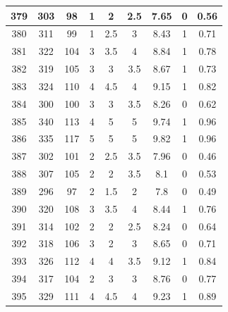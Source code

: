 \documentclass[11pt]{article}
\begin{document}
\begin{appendix}
\begin{longtable}[H]{|c|c|c|c|c|c|c|c|c|}
	379        & 303       & 98          & 1                 & 2   & 2.5 & 7.65 & 0        & 0.56            \\ \hline
	380        & 311       & 99          & 1                 & 2.5 & 3   & 8.43 & 1        & 0.71            \\ \hline
	381        & 322       & 104         & 3                 & 3.5 & 4   & 8.84 & 1        & 0.78            \\ \hline
	382        & 319       & 105         & 3                 & 3   & 3.5 & 8.67 & 1        & 0.73            \\ \hline
	383        & 324       & 110         & 4                 & 4.5 & 4   & 9.15 & 1        & 0.82            \\ \hline
	384        & 300       & 100         & 3                 & 3   & 3.5 & 8.26 & 0        & 0.62            \\ \hline
	385        & 340       & 113         & 4                 & 5   & 5   & 9.74 & 1        & 0.96            \\ \hline
	386        & 335       & 117         & 5                 & 5   & 5   & 9.82 & 1        & 0.96            \\ \hline
	387        & 302       & 101         & 2                 & 2.5 & 3.5 & 7.96 & 0        & 0.46            \\ \hline
	388        & 307       & 105         & 2                 & 2   & 3.5 & 8.1  & 0        & 0.53            \\ \hline
	389        & 296       & 97          & 2                 & 1.5 & 2   & 7.8  & 0        & 0.49            \\ \hline
	390        & 320       & 108         & 3                 & 3.5 & 4   & 8.44 & 1        & 0.76            \\ \hline
	391        & 314       & 102         & 2                 & 2   & 2.5 & 8.24 & 0        & 0.64            \\ \hline
	392        & 318       & 106         & 3                 & 2   & 3   & 8.65 & 0        & 0.71            \\ \hline
	393        & 326       & 112         & 4                 & 4   & 3.5 & 9.12 & 1        & 0.84            \\ \hline
	394        & 317       & 104         & 2                 & 3   & 3   & 8.76 & 0        & 0.77            \\ \hline
	395        & 329       & 111         & 4                 & 4.5 & 4   & 9.23 & 1        & 0.89            \\ \hline

\end{longtable}
\end{appendix}
\end{document}
